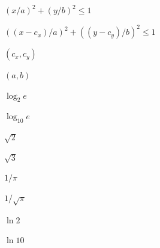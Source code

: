 \documentclass{article}
\begin{document}
$ (x/a)^2 + (y/b)^2 \le 1 $
\pagebreak

$ ((x-c_x)/a)^2 + ((y-c_y)/b)^2 \le 1 $
\pagebreak

$ (c_x, c_y) $
\pagebreak

$ (a, b) $
\pagebreak

$ \log_2 e $
\pagebreak

$ \log_{10} e $
\pagebreak

$ \sqrt{2} $
\pagebreak

$ \sqrt{3} $
\pagebreak

$ 1/\pi $
\pagebreak

$ 1/\sqrt{\pi} $
\pagebreak

$ \ln 2 $
\pagebreak

$ \ln 10 $
\pagebreak
\end{document}
